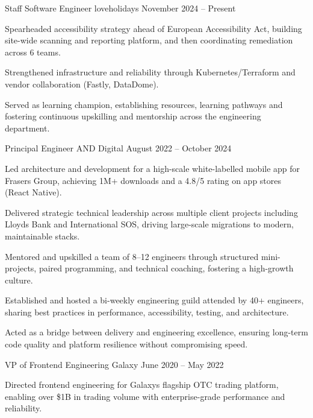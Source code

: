 \documentclass[]{resume-format}
\begin{document}
\begin{cventries}
    \cventry
    { Staff Software Engineer }
    { loveholidays }
    {}
    { November 2024 – Present }
    {\begin{cvitems}
        \item { Spearheaded accessibility strategy ahead of European Accessibility Act, building site-wide scanning and reporting platform, and then coordinating remediation across 6 teams. }
        \item { Strengthened infrastructure and reliability through Kubernetes/Terraform and vendor collaboration (Fastly, DataDome). }
        \item { Served as learning champion, establishing resources, learning pathways and fostering continuous upskilling and mentorship across the engineering department. }
    \end{cvitems}}
    \cventry
    { Principal Engineer }
    { AND Digital }
    {}
    { August 2022 – October 2024 }
    {\begin{cvitems}
        \item { Led architecture and development for a high-scale white-labelled mobile app for Frasers Group, achieving 1M+ downloads and a 4.8/5 rating on app stores (React Native). }
        \item { Delivered strategic technical leadership across multiple client projects including Lloyds Bank and International SOS, driving large-scale migrations to modern, maintainable stacks. }
        \item { Mentored and upskilled a team of 8–12 engineers through structured mini-projects, paired programming, and technical coaching, fostering a high-growth culture. }
        \item { Established and hosted a bi-weekly engineering guild attended by 40+ engineers, sharing best practices in performance, accessibility, testing, and architecture. }
        \item { Acted as a bridge between delivery and engineering excellence, ensuring long-term code quality and platform resilience without compromising speed. }
    \end{cvitems}}
    \cventry
    { VP of Frontend Engineering }
    { Galaxy }
    {}
    { June 2020 – May 2022 }
    {\begin{cvitems}
        \item { Directed frontend engineering for Galaxy\textquotesingle{}s flagship OTC trading platform, enabling over \$1B in trading volume with enterprise-grade performance and reliability. }

\end{cvitems}}
\end{cventries}
\end{document}
